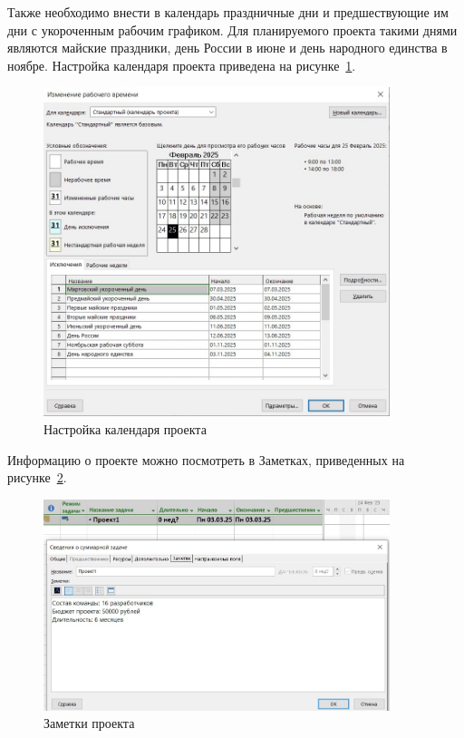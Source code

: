 Также необходимо внести в календарь праздничные дни и предшествующие им дни с укороченным рабочим графиком.
Для планируемого проекта такими днями являются майские праздники, день России в июне и день народного единства в ноябре.
Настройка календаря проекта приведена на рисунке~\ref{fig:calendar}.

\begin{figure}[H]
	\centering
	\includegraphics[width=0.9\textwidth]{img/lab1/task1/calendar.jpg}
	\caption{Настройка календаря проекта}
	\label{fig:calendar}
\end{figure}

Информацию о проекте можно посмотреть в Заметках, приведенных на рисунке~\ref{fig:notes}.

\begin{figure}[H]
	\centering
	\includegraphics[width=0.9\textwidth]{img/lab1/task1/notes.jpg}
	\caption{Заметки проекта}
	\label{fig:notes}
\end{figure}

